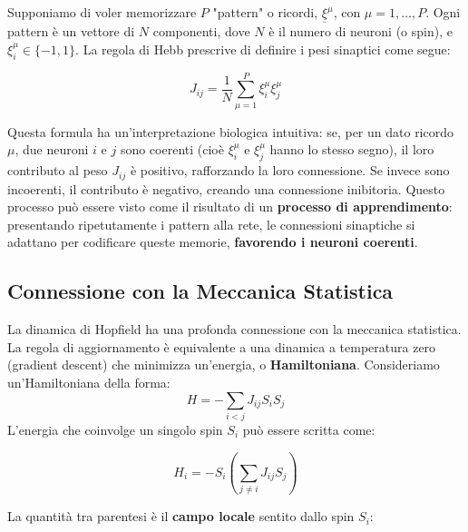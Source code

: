 Supponiamo di voler memorizzare $P$ "pattern" o ricordi, $\underline{\xi}^\mu$, con $\mu = 1, \dots, P$. Ogni pattern è un vettore di $N$ componenti, dove $N$ è il numero di neuroni (o spin), e $\xi_i^\mu \in \{-1, 1\}$. La regola di Hebb prescrive di definire i pesi sinaptici come segue:

\begin{tcolorbox}[colback=yellow!30,  
                  colframe=yellow!50!orange,  
                  boxrule=0.8pt, 
                  arc=3pt,  
                  top=4pt, bottom=4pt, left=6pt, right=6pt,
                  enhanced,
                  sharp corners=south]
\begin{equation}
J_{ij} = \frac{1}{N} \sum_{\mu=1}^{P} \xi_i^\mu \xi_j^\mu
\end{equation}
\end{tcolorbox}


Questa formula ha un'interpretazione biologica intuitiva: se, per un dato ricordo $\mu$, due neuroni $i$ e $j$ sono coerenti (cioè $\xi_i^\mu$ e $\xi_j^\mu$ hanno lo stesso segno), il loro contributo al peso $J_{ij}$ è positivo, rafforzando la loro connessione. Se invece sono incoerenti, il contributo è negativo, creando una connessione inibitoria. Questo processo può essere visto come il risultato di un \textbf{processo di apprendimento}: presentando ripetutamente i pattern alla rete, le connessioni sinaptiche si adattano per codificare queste memorie, \textbf{favorendo i neuroni coerenti}.

\subsection{Connessione con la Meccanica Statistica}
La dinamica di Hopfield ha una profonda connessione con la meccanica statistica. La regola di aggiornamento è equivalente a una dinamica a temperatura zero (gradient descent) che minimizza un'energia, o \textbf{Hamiltoniana}. Consideriamo un'Hamiltoniana della forma:
\begin{equation}
H = - \sum_{i<j} J_{ij} S_i S_j
\end{equation}
L'energia che coinvolge un singolo spin $S_i$ può essere scritta come:

\begin{equation}
H_i = -S_i \left( \sum_{j \neq i} J_{ij} S_j \right)
\end{equation}

La quantità tra parentesi è il \textbf{campo locale} sentito dallo spin $S_i$:

